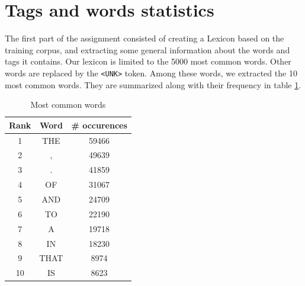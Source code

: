 \documentclass[10pt, a4paper, oneside]{article} %
\begin{document}



%
%
%






\section{Tags and words statistics}
The first part of the assignment consisted of creating a Lexicon based on the training corpus, and extracting some general information about the words and tags it contains. Our lexicon is limited to the 5000 most common words. Other words are replaced by the \texttt{<UNK>} token. Among these words, we extracted the 10 most common words. They are summarized along with their frequency in table \ref{words}.
\begin{table}[!h]
\centering
\begin{tabular}{ | c | c | c | }
\hline
Rank & Word & \# occurences \\ \hline
1 & THE & 59466 \\
2 & , & 49639 \\
3 & . & 41859 \\
4 & OF & 31067 \\
5 & AND & 24709 \\
6 & TO & 22190 \\
7 & A & 19718 \\
8 & IN & 18230 \\
9 & THAT & 8974 \\
10 & IS &8623 \\ \hline
\end{tabular}
\caption{Most common words}
\label{words}
\end{table}
\end{document}

